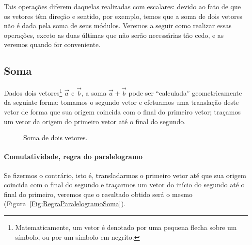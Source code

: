 Tais operações diferem daquelas realizadas com escalares: devido ao fato de que os vetores têm direção e sentido, por exemplo, temos que a soma de dois vetores não é dada pela soma de seus módulos. Veremos a seguir como realizar essas operações, exceto as duas últimas que não serão necessárias tão cedo, e as veremos quando for conveniente.

\subsection{Soma}

Dados dois vetores\footnote{Matematicamente, um vetor é denotado por uma pequena flecha sobre um símbolo, ou por um símbolo em negrito.} $\vec{a}$ e $\vec{b}$, a soma $\vec{a}+\vec{b}$ pode ser ``calculada'' geometricamente da seguinte forma: tomamos o segundo vetor e efetuamos uma translação deste vetor de forma que sua origem coincida com o final do primeiro vetor; traçamos um vetor da origem do primeiro vetor até o final do segundo. 

\begin{figure}
\centering
{}
\caption{Soma de dois vetores.}
\end{figure}


\paragraph{Comutatividade, regra do paralelogramo}

Se fizermos o contrário, isto é, transladarmos o primeiro vetor até que sua origem coincida com o final do segundo e traçarmos um vetor do início do segundo até o final do primeiro, veremos que o resultado obtido será o mesmo (Figura~\ref{Fig:RegraParalelogramoSoma}).

